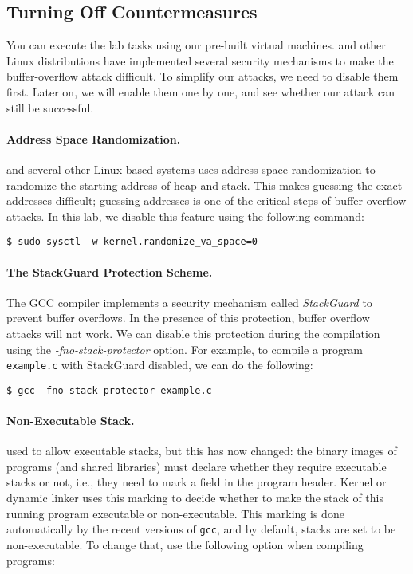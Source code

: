 \subsection{Turning Off Countermeasures}

You can execute the lab tasks using our pre-built \ubuntu virtual machines. 
\ubuntu and other Linux distributions have implemented several
security mechanisms to make the buffer-overflow attack difficult. 
To simplify our attacks, we need to disable them first. Later on, we will enable them one by
one, and see whether our attack can still be successful.


\paragraph{Address Space Randomization.}
\ubuntu and several other Linux-based systems uses address space
randomization to randomize the starting address of heap and
stack. This makes guessing the exact addresses difficult; guessing
addresses is one of the critical steps of buffer-overflow attacks.  In
this lab, we disable this feature using the following command:

\begin{lstlisting}
$ sudo sysctl -w kernel.randomize_va_space=0
\end{lstlisting}


\paragraph{The StackGuard Protection Scheme.}
The GCC compiler implements a security mechanism called
\textit{StackGuard} to prevent buffer overflows. In the presence of this
protection, buffer overflow attacks will not work. We can disable this
protection during the compilation using the 
\emph{-fno-stack-protector} option. For example, to compile a program
\texttt{example.c} with StackGuard disabled, we can do the following:


\begin{lstlisting}
$ gcc -fno-stack-protector example.c
\end{lstlisting}


\paragraph{Non-Executable Stack.} \ubuntu used to allow executable stacks, but
this has now changed: the binary images of programs (and shared libraries) 
must declare whether they require executable stacks or not, i.e., they need to 
mark a field in the program header. Kernel or dynamic linker uses this marking
to decide whether to make the stack of this running program executable or 
non-executable. This marking is done automatically by the 
recent versions of {\tt gcc}, and by default, stacks are set to 
be non-executable.
To change that, use the following option when compiling programs:


